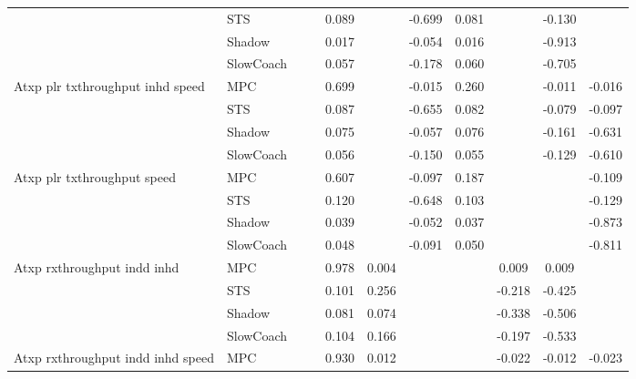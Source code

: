 \begin{tabular}{|l|l|*{9}{c|}}
                              & STS &       &        &     0.089 &     & -0.699 &  0.081 &      &  -0.130 &       \\
                              & Shadow &       &        &     0.017 &     & -0.054 &  0.016 &      &  -0.913 &       \\
                              & SlowCoach &       &        &     0.057 &     & -0.178 &  0.060 &      &  -0.705 &       \\
\midrule
Atxp plr txthroughput inhd speed    & MPC &       &        &     0.699 &     & -0.015 &  0.260 &      &  -0.011 &   -0.016 \\
                              & STS &       &        &     0.087 &     & -0.655 &  0.082 &      &  -0.079 &   -0.097 \\
                              & Shadow &       &        &     0.075 &     & -0.057 &  0.076 &      &  -0.161 &   -0.631 \\
                              & SlowCoach &       &        &     0.056 &     & -0.150 &  0.055 &      &  -0.129 &   -0.610 \\
\midrule
Atxp plr txthroughput speed    & MPC &       &        &     0.607 &     & -0.097 &  0.187 &      &      &   -0.109 \\
                              & STS &       &        &     0.120 &     & -0.648 &  0.103 &      &      &   -0.129 \\
                              & Shadow &       &        &     0.039 &     & -0.052 &  0.037 &      &      &   -0.873 \\
                              & SlowCoach &       &        &     0.048 &     & -0.091 &  0.050 &      &      &   -0.811 \\
\midrule
Atxp rxthroughput indd inhd    & MPC &       &        &     0.978 &  0.004 &     &     &   0.009 &   0.009 &       \\
                              & STS &       &        &     0.101 &  0.256 &     &     &  -0.218 &  -0.425 &       \\
                              & Shadow &       &        &     0.081 &  0.074 &     &     &  -0.338 &  -0.506 &       \\
                              & SlowCoach &       &        &     0.104 &  0.166 &     &     &  -0.197 &  -0.533 &       \\
\midrule
Atxp rxthroughput indd inhd speed    & MPC &       &        &     0.930 &  0.012 &     &     &  -0.022 &  -0.012 &   -0.023 \\

\end{tabular}
